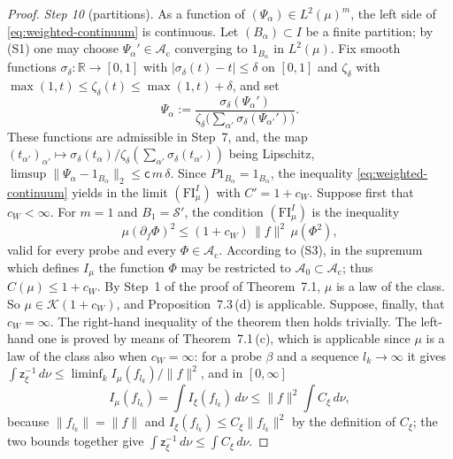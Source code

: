 \documentclass[11pt,letterpaper,reqno]{amsart}
\theoremstyle{definition}
\begin{document}
\begin{proof}
\emph{Step 10} (partitions).
As a function of $(\Psi_\alpha)\in L^2(\mu)^m$, the left side of \eqref{eq:weighted-continuum} is continuous.
Let $(B_\alpha)\subset I$ be a finite partition; by (S1) one may choose $\Psi_\alpha'\in\mathcal A_{\mathrm c}$ converging to $1_{B_\alpha}$ in $L^2(\mu)$.
Fix smooth functions $\sigma_\delta\colon\mathbb R\to[0,1]$ with $|\sigma_\delta(t)-t|\le\delta$ on $[0,1]$ and $\zeta_\delta$ with $\max(1,t)\le\zeta_\delta(t)\le\max(1,t)+\delta$, and set
\begin{equation*}
\Psi_\alpha:=\frac{\sigma_\delta(\Psi_\alpha')}{\zeta_\delta\bigl(\sum_{\alpha'}\sigma_\delta(\Psi_{\alpha'}')\bigr)}.
\end{equation*}
These functions are admissible in Step~7, and, the map $(t_{\alpha'})_{\alpha'}\mapsto\sigma_\delta(t_\alpha)/\zeta_\delta(\sum_{\alpha'}\sigma_\delta(t_{\alpha'}))$ being Lipschitz, $\limsup\|\Psi_\alpha-1_{B_\alpha}\|_2\le\mathsf c\,m\,\delta$.
Since $P1_{B_\alpha}=1_{B_\alpha}$, the inequality \eqref{eq:weighted-continuum} yields in the limit $(\mathrm{FI}^I_\mu)$ with $C'=1+c_W$.
Suppose first that $c_W<\infty$.
For $m=1$ and $B_1=\mathcal S'$, the condition $(\mathrm{FI}^I_\mu)$ is the inequality
\begin{equation*}
\mu(\partial_f\Phi)^2\le(1+c_W)\,\|f\|^2\,\mu(\Phi^2),
\end{equation*}
valid for every probe and every $\Phi\in\mathcal A_{\mathrm c}$.
According to (S3), in the supremum which defines $I_\mu$ the function $\Phi$ may be restricted to $\mathcal A_0\subset\mathcal A_{\mathrm c}$; thus $C(\mu)\le1+c_W$.
By Step~1 of the proof of Theorem~7.1, $\mu$ is a law of the class.
So $\mu\in\mathcal K(1+c_W)$, and Proposition~7.3\,(d) is applicable.
Suppose, finally, that $c_W=\infty$.
The right-hand inequality of the theorem then holds trivially.
The left-hand one is proved by means of Theorem~7.1\,(c), which is applicable since $\mu$ is a law of the class also when $c_W=\infty$:
for a probe $\beta$ and a sequence $l_k\to\infty$ it gives $\int\mathsf z_\xi^{-1}\,d\nu\le\liminf_kI_\mu(f_{l_k})/\|f\|^2$,
and in $[0,\infty]$
\begin{equation*}
I_\mu(f_{l_k})=\int I_\xi(f_{l_k})\,d\nu\le\|f\|^2\int C_\xi\,d\nu,
\end{equation*}
because $\|f_{l_k}\|=\|f\|$ and $I_\xi(f_{l_k})\le C_\xi\|f_{l_k}\|^2$ by the definition of $C_\xi$;
the two bounds together give $\int\mathsf z_\xi^{-1}\,d\nu\le\int C_\xi\,d\nu$.


\end{proof}
\end{document}
